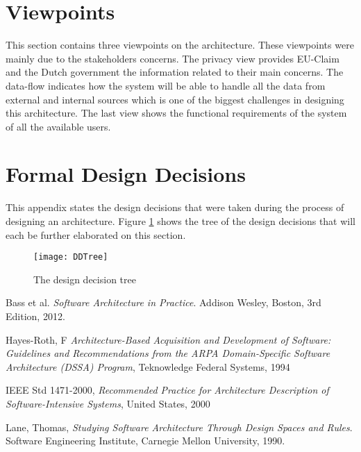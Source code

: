 \documentclass{article}
\begin{document}
\section{Viewpoints}

This section contains three viewpoints on the architecture. These viewpoints were mainly due to the stakeholders concerns. The privacy view provides EU-Claim and the Dutch government the information related to their
main concerns. The data-flow indicates how the system will be able to handle all the data from external and internal sources which is one of the biggest challenges in designing this architecture. The last view shows the functional
requirements of the system of all the available users. 





\appendix


\clearpage
\section{Formal Design Decisions}

This appendix states the design decisions that were taken during the process of designing an architecture. Figure \ref{fig:ddtree} shows the tree of the design decisions that will each be further elaborated on this section. 

\begin{figure}[!ht]
\texttt{[image: DDTree]}
\caption{The design decision tree}
\label{fig:ddtree}
\end{figure}

\clearpage

\newpage

\newpage
%

\newpage
%

\newpage

\newpage

\clearpage


\clearpage
\begin{thebibliography}{9}

Bass et al.
  \emph{Software Architecture in Practice}.
  Addison Wesley, Boston,
  3rd Edition,
  2012.

 Hayes-Roth, F
 \emph{Architecture-Based Acquisition and Development of Software: Guidelines and Recommendations from the ARPA Domain-Speciﬁc
 Software Architecture (DSSA) Program},
 Teknowledge Federal Systems,
 1994

 IEEE Std 1471-2000,
 \emph{Recommended Practice for Architecture Description of Software-Intensive Systems},
 United States,
 2000

  Lane, Thomas,
  \emph{Studying Software Architecture Through Design Spaces and Rules}.
  Software Engineering Institute, Carnegie Mellon University,
  1990.

\end{thebibliography}
\end{document}
